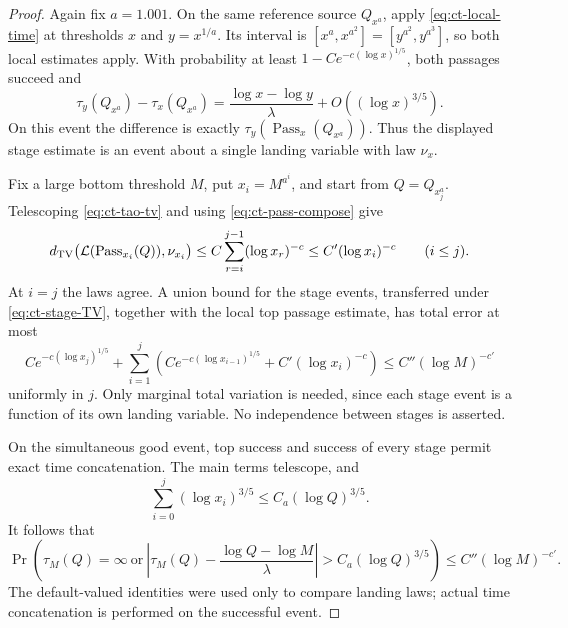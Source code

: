\begin{proof}
Again fix \(a=1.001\). On the same reference source
\(Q_{x^a}\), apply \eqref{eq:ct-local-time} at thresholds
\(x\) and \(y=x^{1/a}\). Its interval is
\([x^a,x^{a^2}]=[y^{a^2},y^{a^3}]\), so both local estimates
apply. With probability at least
\(1-Ce^{-c(\log x)^{1/5}}\), both passages succeed and
\[
 \tau_y(Q_{x^a})-\tau_x(Q_{x^a})
       =\frac{\log x-\log y}{\lambda}
                       +O((\log x)^{3/5}).
\]
On this event the difference is exactly
\(\tau_y(\operatorname{Pass}_x(Q_{x^a}))\).
Thus the displayed stage estimate is an event about a single
landing variable with law \(\nu_x\).

Fix a large bottom threshold \(M\), put \(x_i=M^{a^i}\), and
start from \(Q=Q_{x_j^a}\). Telescoping
\eqref{eq:ct-tao-tv} and using \eqref{eq:ct-pass-compose} give
\begin{equation}\label{eq:ct-stage-TV}
 d_{\rm TV}\bigl(\mathcal L(\operatorname{Pass}_{x_i}(Q)),
                 \nu_{x_i}\bigr)
 \le C\sum_{r=i}^{j-1}(\log x_r)^{-c}
 \le C'(\log x_i)^{-c}\qquad(i\le j).
\end{equation}
At \(i=j\) the laws agree. A union bound for the stage events,
transferred under \eqref{eq:ct-stage-TV}, together with the local
top passage estimate, has total error at most
\[
 Ce^{-c(\log x_j)^{1/5}}
 +\sum_{i=1}^j
   \left(Ce^{-c(\log x_{i-1})^{1/5}}
                           +C'(\log x_i)^{-c}\right)
 \le C''(\log M)^{-c'}
\]
uniformly in \(j\). Only marginal total variation is needed,
since each stage event is a function of its own landing variable.
No independence between stages is asserted.

On the simultaneous good event, top success and success of every
stage permit exact time concatenation. The main terms telescope,
and
\[
 \sum_{i=0}^j(\log x_i)^{3/5}
       \le C_a(\log Q)^{3/5}.
\]
It follows that
\begin{equation}\label{eq:ct-global-time-M}
 \Pr\left(\tau_M(Q)=\infty\ \text{or}\
  \left|\tau_M(Q)-\frac{\log Q-\log M}{\lambda}\right|
                   >C_a(\log Q)^{3/5}\right)
       \le C''(\log M)^{-c'}.
\end{equation}
The default-valued identities were used only to compare landing
laws; actual time concatenation is performed on the successful event.


\end{proof}
